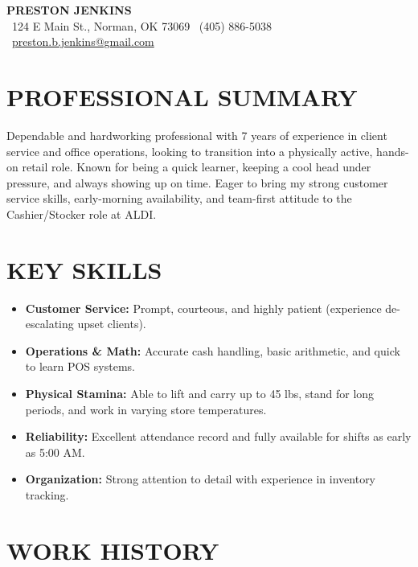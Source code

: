\documentclass[11pt, letterpaper]{article}
\begin{document}
\begin{center}
    {\Huge \textbf{\color{darkblue} PRESTON JENKINS}} \\ \vspace{4pt}
    \small 
    \faMapMarker \ 124 E Main St., Norman, OK 73069 \quad 
    \faPhone \ (405) 886-5038 \quad 
    \faEnvelope \ \href{mailto:preston.b.jenkins@gmail.com}{preston.b.jenkins@gmail.com}
\end{center}

\vspace{2pt}

\section*{PROFESSIONAL SUMMARY}
Dependable and hardworking professional with 7 years of experience in client service and office operations, looking to transition into a physically active, hands-on retail role. Known for being a quick learner, keeping a cool head under pressure, and always showing up on time. Eager to bring my strong customer service skills, early-morning availability, and team-first attitude to the Cashier/Stocker role at ALDI.

\section*{KEY SKILLS}
\begin{itemize}[leftmargin=0.25in, label={$\bullet$}, itemsep=0pt, topsep=2pt]
    \item \textbf{Customer Service:} Prompt, courteous, and highly patient (experience de-escalating upset clients).
    \item \textbf{Operations \& Math:} Accurate cash handling, basic arithmetic, and quick to learn POS systems.
    \item \textbf{Physical Stamina:} Able to lift and carry up to 45 lbs, stand for long periods, and work in varying store temperatures.
    \item \textbf{Reliability:} Excellent attendance record and fully available for shifts as early as 5:00 AM.
    \item \textbf{Organization:} Strong attention to detail with experience in inventory tracking.
\end{itemize}

\section*{WORK HISTORY}
\end{document}
